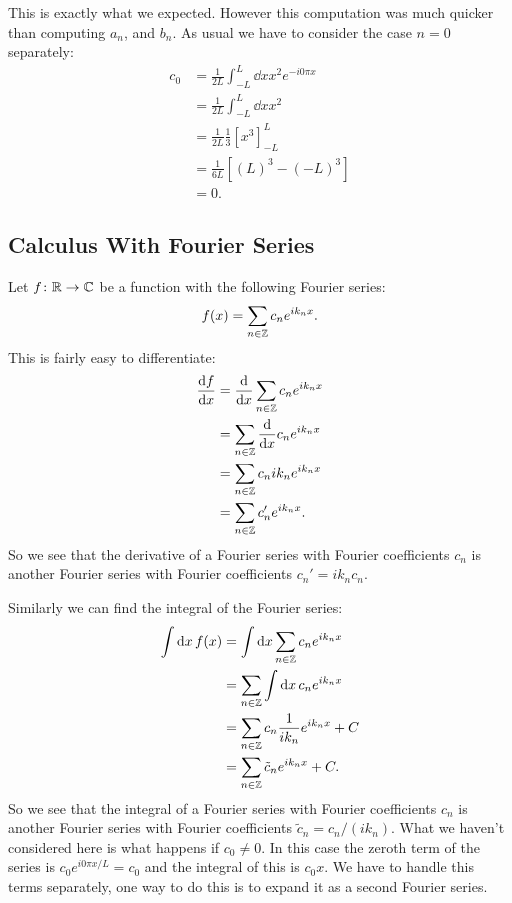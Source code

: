 \documentclass[a4paper]{article}
\begin{document}
    This is exactly what we expected.
    However this computation was much quicker than computing \(a_n\), and \(b_n\).
    As usual we have to consider the case \(n = 0\) separately:
    \begin{align*}
        c_0 &= \frac{1}{2L} \int_{-L}^{L} \dd{x} x^2e^{-i0\pi x}\\
        &= \frac{1}{2L} \int_{-L}^{L} \dd{x} x^2\\
        &= \frac{1}{2L} \frac{1}{3}[x^3]_{-L}^{L}\\
        &= \frac{1}{6L} [(L)^3 - (-L)^3]\\
        &= 0.
    \end{align*}

    \subsection{Calculus With Fourier Series}
    Let \(f\colon\mathbb{R}\to\mathbb{C}\) be a function with the following Fourier series:
    \[f(x) = \sum_{n\in\mathbb{Z}}c_ne^{ik_nx}.\]
    This is fairly easy to differentiate:
    \begin{align*}
        \dv{f}{x} &= \dv{x}\sum_{n\in\mathbb{Z}}c_ne^{ik_nx}\\
        &= \sum_{n\in\mathbb{Z}}\dv{x}c_ne^{ik_nx}\\
        &= \sum_{n\in\mathbb{Z}}c_nik_ne^{ik_nx}\\
        &= \sum_{n\in\mathbb{Z}}c_n'e^{ik_nx}.
    \end{align*}
    So we see that the derivative of a Fourier series with Fourier coefficients \(c_n\) is another Fourier series with Fourier coefficients \(c_n' = ik_nc_n\).
    
    Similarly we can find the integral of the Fourier series:
    \begin{align*}
        \int\dd{x} f(x) &= \int\dd{x} \sum_{n\in\mathbb{Z}}c_ne^{ik_nx}\\
        &= \sum_{n\in\mathbb{Z}}\int\dd{x}c_ne^{ik_nx}\\
        &= \sum_{n\in\mathbb{Z}}c_n\frac{1}{ik_n}e^{ik_nx} + C\\
        &= \sum_{n\in\mathbb{Z}}\tilde{c}_ne^{ik_nx} + C.
    \end{align*}
    So we see that the integral of a Fourier series with Fourier coefficients \(c_n\) is another Fourier series with Fourier coefficients \(\tilde{c}_n = c_n/(ik_n)\).
    What we haven't considered here is what happens if \(c_0 \ne 0\).
    In this case the zeroth term of the series is \(c_0e^{i0\pi x/L} = c_0\) and the integral of this is \(c_0x\).
    We have to handle this terms separately, one way to do this is to expand it as a second Fourier series.
    
\end{document}
